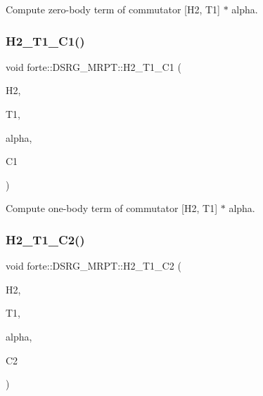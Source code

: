 Compute zero-\/body term of commutator \mbox{[}H2, T1\mbox{]} $\ast$ alpha. 

\mbox{\label{classforte_1_1_d_s_r_g___m_r_p_t_a869a5f60f25b70d36a26e6ed16c165d3}} 
\subsubsection{\texorpdfstring{H2\+\_\+\+T1\+\_\+\+C1()}{H2\_T1\_C1()}}
{\footnotesize\ttfamily void forte\+::\+D\+S\+R\+G\+\_\+\+M\+R\+P\+T\+::\+H2\+\_\+\+T1\+\_\+\+C1 (\begin{DoxyParamCaption}\item[{Blocked\+Tensor \&}]{H2,  }\item[{Blocked\+Tensor \&}]{T1,  }\item[{const double \&}]{alpha,  }\item[{Blocked\+Tensor \&}]{C1 }\end{DoxyParamCaption})\hspace{0.3cm}{\ttfamily [protected]}}



Compute one-\/body term of commutator \mbox{[}H2, T1\mbox{]} $\ast$ alpha. 

\mbox{\label{classforte_1_1_d_s_r_g___m_r_p_t_a2734af50d9ee05d68aa6637ed00dbbbf}} 
\subsubsection{\texorpdfstring{H2\+\_\+\+T1\+\_\+\+C2()}{H2\_T1\_C2()}}
{\footnotesize\ttfamily void forte\+::\+D\+S\+R\+G\+\_\+\+M\+R\+P\+T\+::\+H2\+\_\+\+T1\+\_\+\+C2 (\begin{DoxyParamCaption}\item[{Blocked\+Tensor \&}]{H2,  }\item[{Blocked\+Tensor \&}]{T1,  }\item[{const double \&}]{alpha,  }\item[{Blocked\+Tensor \&}]{C2 }\end{DoxyParamCaption})\hspace{0.3cm}{\ttfamily [protected]}}



